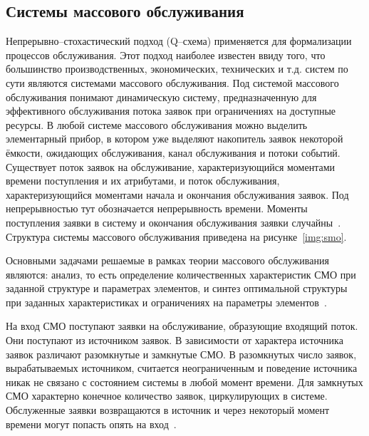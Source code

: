 \subsection{Системы массового обслуживания}

Непрерывно--стохастический подход (Q--схема) применяется для формализации процессов обслуживания.  Этот подход наиболее известен ввиду того, что большинство производственных, экономических, технических и т.д. систем по сути являются системами массового обслуживания. Под системой массового обслуживания понимают динамическую систему, предназначенную для эффективного обслуживания потока заявок  при ограничениях на доступные ресурсы. В любой системе массового обслуживания можно выделить элементарный прибор, в котором уже выделяют накопитель заявок некоторой ёмкости, ожидающих обслуживания, канал обслуживания и потоки событий. Существует поток заявок на обслуживание, характеризующийся моментами времени поступления и их атрибутами, и поток обслуживания, характеризующийся моментами начала и окончания обслуживания заявок. Под непрерывностью тут обозначается непрерывность времени. Моменты поступления заявки в систему и окончания обслуживания заявки случайны~\cite{sheme_types}. Структура системы массового обслуживания приведена на рисунке~\ref{img:smo}.

\FloatBarrier

Основными задачами решаемые в рамках теории массового обслуживания являются: анализ, то есть определение количественных характеристик СМО при заданной структуре и параметрах элементов, и синтез оптимальной структуры при заданных характеристиках и ограничениях на параметры элементов~\cite{ak_det}.

На вход СМО поступают заявки на обслуживание, образующие входящий поток. Они поступают из источником заявок. В зависимости от характера источника заявок различают разомкнутые и замкнутые СМО. В разомкнутых число заявок, вырабатываемых источником, считается неограниченным и поведение источника никак не связано с состоянием системы в любой момент времени. Для замкнутых СМО характерно конечное количество заявок, циркулирующих в системе. Обслуженные заявки возвращаются в источник и через некоторый момент времени могут попасть опять на вход~\cite{ak_det}.

